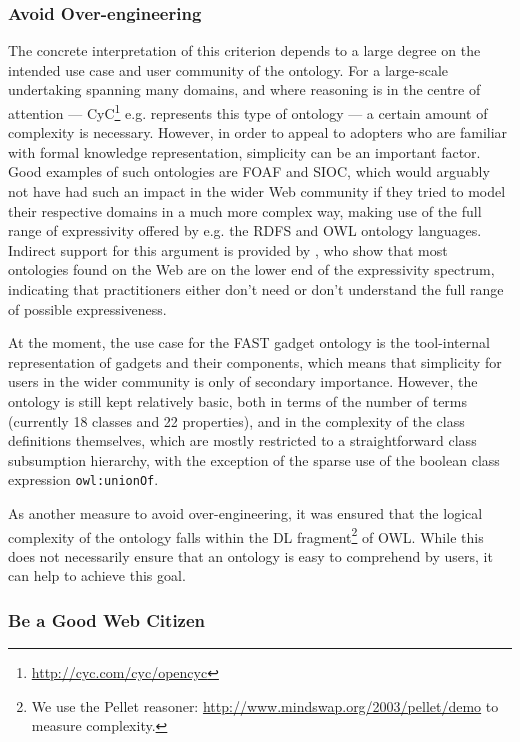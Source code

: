 \documentclass[twoside]{fast_latex}
\begin{document}
\subsubsection{Avoid Over-engineering} %
\label{ssub:avoid_of_over_engineering}

The concrete interpretation of this criterion depends to a large degree on the intended use case and user community of the ontology. For a large-scale undertaking spanning many domains, and where reasoning is in the centre of attention --- CyC\footnote{\url{http://cyc.com/cyc/opencyc}} e.g. represents this type of ontology  --- a certain amount of complexity is necessary. However, in order to appeal to adopters who are familiar with formal knowledge representation, simplicity can be an important factor. Good examples of such ontologies are FOAF and SIOC, which would arguably not have had such an impact in the wider Web community if they tried to model their respective domains in a much more complex way, making use of the full range of expressivity offered by e.g. the RDFS and OWL ontology languages. Indirect support for this argument is provided by \cite{wang2006owl_survey}, who show that most ontologies found on the Web are on the lower end of the expressivity spectrum, indicating that practitioners either don't need or don't understand the full range of possible expressiveness.

At the moment, the use case for the FAST gadget ontology is the tool-internal representation of gadgets and their components, which means that simplicity for users in the wider community is only of secondary importance. However, the ontology is still kept relatively basic, both in terms of the number of terms (currently 18 classes and 22 properties), and in the complexity of the class definitions themselves, which are mostly restricted to a straightforward class subsumption hierarchy, with the exception of the sparse use of the boolean class expression \texttt{owl:unionOf}.

As another measure to avoid over-engineering, it was ensured that the logical complexity of the ontology falls within the DL fragment\footnote{We use the Pellet reasoner: \url{http://www.mindswap.org/2003/pellet/demo} to measure complexity.} of OWL. While this does not necessarily ensure that an ontology is easy to comprehend by users, it can help to achieve this goal.


\subsubsection{Be a Good Web Citizen} %
\label{ssub:be_a_good_web_citizen}
\end{document}
